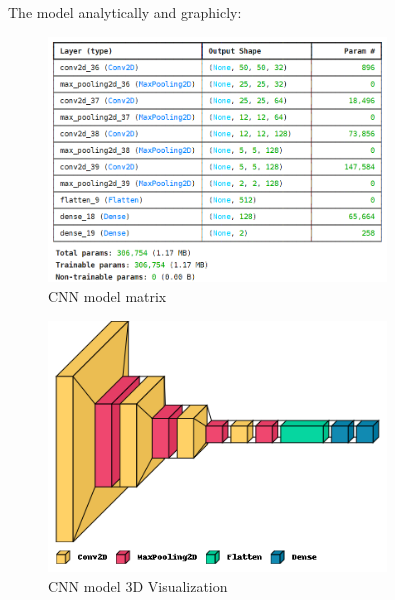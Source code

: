 The model analytically and graphicly:
\begin{figure}[H]
    \centering
    \includegraphics[width=0.8\textwidth]{Images/Screenshot 2024-04-15 184102.png}
    \caption{CNN model matrix}
    \label{fig:example}
\end{figure}
\begin{figure}[H]
    \centering
    \includegraphics[width=0.8\textwidth]{Images/download.png}
    \caption{CNN model 3D Visualization}
    \label{fig:example}
\end{figure}